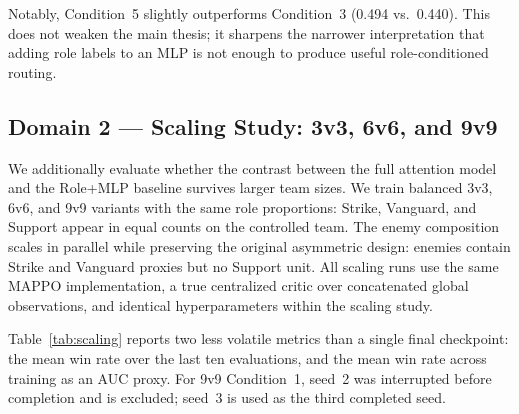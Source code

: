 Notably, Condition~5 slightly outperforms Condition~3 (0.494 vs.\ 0.440). This does not weaken the main thesis; it sharpens the narrower interpretation that adding role labels to an MLP is not enough to produce useful role-conditioned routing.

\subsection{Domain 2 --- Scaling Study: 3v3, 6v6, and 9v9}
\label{sec:scaling}

We additionally evaluate whether the contrast between the full attention model and the Role+MLP baseline survives larger team sizes. We train balanced 3v3, 6v6, and 9v9 variants with the same role proportions: Strike, Vanguard, and Support appear in equal counts on the controlled team. The enemy composition scales in parallel while preserving the original asymmetric design: enemies contain Strike and Vanguard proxies but no Support unit. All scaling runs use the same MAPPO implementation, a true centralized critic over concatenated global observations, and identical hyperparameters within the scaling study.

Table~\ref{tab:scaling} reports two less volatile metrics than a single final checkpoint: the mean win rate over the last ten evaluations, and the mean win rate across training as an AUC proxy. For 9v9 Condition~1, seed~2 was interrupted before completion and is excluded; seed~3 is used as the third completed seed.

\begin{table}[h]
\centering
\small
\caption{Scaling results for Condition~1 (Full attention) and Condition~3 (Role+MLP). Values are mean $\pm$ std over three completed seeds.}
\label{tab:scaling}
\setlength{\tabcolsep}{3pt}
\end{table}

